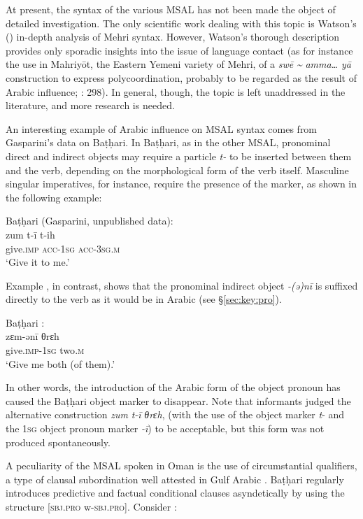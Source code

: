 \documentclass[output=paper]{langsci/langscibook}
\begin{document}
At present, the syntax of the various MSAL has not been made the object of detailed investigation. The only scientific work dealing with this topic is Watson's (\citeyear{Watson2012}) in-depth analysis of Mehri syntax. However, Watson’s thorough description provides only sporadic insights into the issue of language contact (as for instance the use in Mahriyōt, the Eastern Yemeni variety of Mehri, of a \textit{swē} \textit{{\textasciitilde}} \textit{amma…} \textit{yā} construction to express polycoordination, probably to be regarded as the result of Arabic influence; \citealt{Watson2012}: 298). In general, though, the topic is left unaddressed in the literature, and more research is needed.

An interesting example of Arabic influence on MSAL syntax comes from Gasparini’s data on Baṭḥari. In Baṭḥari, as in the other MSAL, pronominal direct and indirect objects may require a particle \textit{t-} to be inserted between them and the verb, depending on the morphological form of the verb itself. Masculine singular imperatives, for instance, require the presence of the marker, as shown in the following example:

\ea	
{Baṭḥari (Gasparini, unpublished data):}\\
\gll zum t-ī t-ih\\
     give.\textsc{imp} \textsc{acc-1sg} \textsc{acc-3sg.m} \\
\glt `Give it to me.'
\z

Example , in contrast, shows that the pronominal indirect object \textit{-(ə)nī} is suffixed directly to the verb as it would be in Arabic (see §\ref{sec:key:pro}).

\ea\label{ex:key:ani}
{Baṭḥari \citep[66]{Gasparini2018}:}\\
\gll zɛm-ənī θrɛh\\
     give.\textsc{imp}-\textsc{1sg} two\textsc{.m}\\
\glt `Give me both (of them).'
\z

 In other words, the introduction of the Arabic form of the object pronoun has caused the Baṭḥari object marker to disappear. Note that informants judged the alternative construction \textit{zum} \textit{t-ī} \textit{θrɛh}, (with the use of the object marker \textit{t}- and the 1\textsc{sg} object pronoun marker \textit{-ī}) to be acceptable, but this form was not produced spontaneously.

A peculiarity of the MSAL spoken in Oman is the use of circumstantial qualifiers, a type of clausal subordination well attested in Gulf Arabic \citep{Persson2009}. Baṭḥari regularly introduces predictive and factual conditional clauses asyndetically by using the structure [\textsc{sbj.pro} w-\textsc{sbj.pro}]. Consider :
\end{document}
